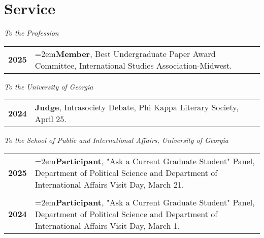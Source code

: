 \documentclass[letterpaper,12pt]{article}
\begin{document}
\section{Service}
\textit{To the Profession}
\begin{xltabular}{\dimexpr\textwidth-0in}{p{.85in}X}
\textbf{2025} &  \hangindent=2em\textbf{Member}, Best Undergraduate Paper Award Committee, International Studies Association-Midwest.
\end{xltabular}
\par
\textit{To the University of Georgia}
\begin{xltabular}{\dimexpr\textwidth-0in}{p{.85in}X}
\textbf{2024} &  \textbf{Judge}, Intrasociety Debate, Phi Kappa Literary Society, April 25.
\end{xltabular}
\par
\textit{To the School of Public and International Affairs, University of Georgia}
\begin{xltabular}{\dimexpr\textwidth-0in}{p{.85in}X}
\textbf{2025} &  \hangindent=2em\textbf{Participant}, "Ask a Current Graduate Student" Panel, Department of Political Science and \mbox{Department} of International Affairs Visit Day, March 21. \\ \\
\textbf{2024} &  \hangindent=2em\textbf{Participant}, "Ask a Current Graduate Student" Panel, Department of Political Science and \mbox{Department} of International Affairs Visit Day, March 1.
\end{xltabular}

\end{document}
